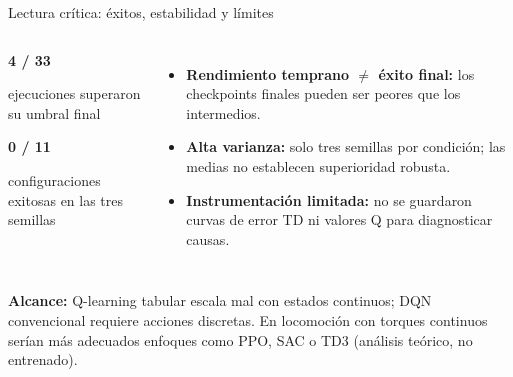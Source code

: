 \documentclass[aspectratio=169,10pt,t]{beamer}
\begin{document}
\begin{frame}{Lectura crítica: éxitos, estabilidad y límites}
\begin{columns}[T,onlytextwidth]
\begin{takeaway}\centering
{\color{Blue}\fontsize{30}{32}\selectfont\bfseries 4 / 33}\par
\small ejecuciones superaron su umbral final\par\vspace{.20cm}
{\color{Warn}\Large\bfseries 0 / 11}\par
\small configuraciones exitosas en las tres semillas
\end{takeaway}
\begin{itemize}\RaggedRight\setlength{\itemsep}{.14cm}
\item \textbf{Rendimiento temprano $\neq$ éxito final:} los checkpoints finales pueden ser peores que los intermedios.
\item \textbf{Alta varianza:} solo tres semillas por condición; las medias no establecen superioridad robusta.
\item \textbf{Instrumentación limitada:} no se guardaron curvas de error TD ni valores Q para diagnosticar causas.
\end{itemize}
\end{columns}
\vspace{.16cm}
\begin{info}\small\textbf{Alcance:} Q-learning tabular escala mal con estados continuos; DQN convencional requiere acciones discretas. En locomoción con torques continuos serían más adecuados enfoques como PPO, SAC o TD3 (análisis teórico, no entrenado).\end{info}
\end{frame}
\end{document}
